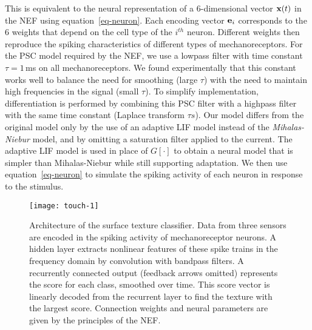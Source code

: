 This is equivalent to the neural representation of a $6$-dimensional vector $\mathbf{x}(t)$ in the NEF using equation~\ref{eq-neuron}. Each encoding vector $\mathbf{e}_i$ corresponds to the $6$ weights that depend on the cell type of the $i^{th}$ neuron. Different weights then reproduce the spiking characteristics of different types of mechanoreceptors.  For the PSC model required by the NEF, we use a lowpass filter with time constant $\tau = 1$\,ms on all mechanoreceptors. We found experimentally that this constant works well to balance the need for smoothing (large $\tau$) with the need to maintain high frequencies in the signal (small $\tau$).  To simplify implementation, differentiation is performed by combining this PSC filter with a highpass filter with the same time constant (Laplace transform $\tau s$). Our model differs from the original model only by  the use of an adaptive LIF model instead of the {\it Mihalas-Niebur} model, and by omitting a saturation filter applied to the current. The adaptive LIF model is used in place of $G[\cdot]$ to obtain a neural model that is simpler than Mihalas-Niebur while still supporting adaptation. We then use equation~\ref{eq-neuron} to simulate the spiking activity of each neuron in response to the stimulus.

\begin{figure}[!tbp]
    \centering
    \vspace{-2pt}
    \texttt{[image: touch-1]}
     
    \caption{\label{fig:touch-network} Architecture of the surface texture classifier. Data from three sensors are encoded in the spiking activity of mechanoreceptor neurons. A hidden layer extracts nonlinear features of these spike trains in the frequency domain by convolution with bandpass filters. A recurrently connected output (feedback arrows omitted) represents the score for each class, smoothed over time. This score vector is linearly decoded from the recurrent layer to find the texture with the largest score. Connection weights and neural parameters  are given by the principles of the NEF.}
\end{figure}

